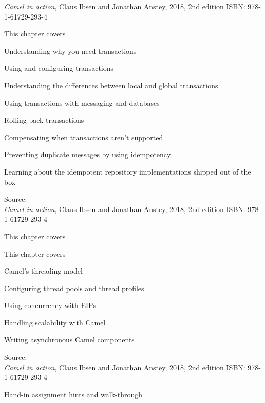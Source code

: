 \documentclass[Screen16to9,17pt]{foils}
\begin{document}
\emph{Camel in action}, Claus Ibsen and Jonathan Anstey, 2018, 2nd edition
ISBN: 978-1-61729-293-4



This chapter covers
\begin{list2}
\item Understanding why you need transactions
\item Using and configuring transactions
\item Understanding the differences between
local and global transactions
\item Using transactions with messaging and databases
\item Rolling back transactions
\item Compensating when transactions aren’t supported
\item Preventing duplicate messages by using idempotency
\item Learning about the idempotent repository
implementations shipped out of the box
\end{list2}
Source: {\footnotesize\\

\emph{Camel in action}, Claus Ibsen and Jonathan Anstey, 2018}, 2nd edition
ISBN: 978-1-61729-293-4






This chapter covers
\begin{list2}
\item This chapter covers
\item Camel’s threading model
\item Configuring thread pools and thread profiles
\item Using concurrency with EIPs
\item Handling scalability with Camel
\item Writing asynchronous Camel components
\end{list2}
Source: {\footnotesize\\

\emph{Camel in action}, Claus Ibsen and Jonathan Anstey, 2018}, 2nd edition
ISBN: 978-1-61729-293-4






Hand-in assignment hints and walk-through
\end{document}
